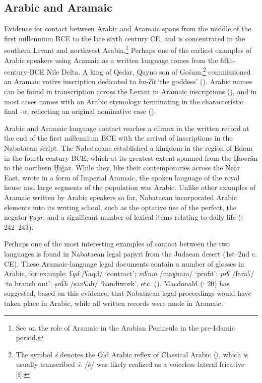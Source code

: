\documentclass[output=paper]{langsci/langscibook}
\begin{document}
\subsection{Arabic and Aramaic}
Evidence for contact between Arabic and Aramaic spans from the middle of the first millennium BCE to the late sixth century CE, and is concentrated in the southern Levant and northwest Arabia.\footnote{See \citet{Stein2018} on the role of Aramaic in the Arabian Peninsula in the pre-Islamic period.} Perhaps one of the earliest examples of Arabic speakers using Aramaic as a written language comes from the fifth-century-BCE Nile Delta. A king of Qedar, Qayno  son of Gośam,\footnote{The symbol \textit{ś} denotes the Old Arabic reflex of Classical Arabic 〈〉, which is usually transcribed \textit{š}. /ś/ was likely realized as a voiceless lateral fricative [ɬ].} commissioned an Aramaic votive inscription dedicated to \textit{hn-ʔlt} ‘the goddess’ (\citealt{Rabinowitz1956}). Arabic names can be found in transcription across the Levant in Aramaic inscriptions (\citealt{Israel1995}), and in most cases names with an Arabic etymology terminating in the characteristic final \textit{-w}, reflecting an original nominative case (\citealt{Al-Jalladforthcoming}). 

Arabic and Aramaic language contact reaches a climax in the written record at the end of the first millennium BCE with the arrival of inscriptions in the Nabataean script. The Nabataeans established a kingdom in the region of Edom in the fourth century BCE, which at its greatest extent spanned from the Ḥawrān to the northern Ḥiǧāz. While they, like their contemporaries across the Near East, wrote in a form of Imperial Aramaic, the spoken language of the royal house and large segments of the population was Arabic. Unlike other examples of Aramaic written by Arabic speakers so far, Nabataean incorporated Arabic elements into its writing school, such as the optative use of the perfect, the negator \textit{ɣayr}, and a significant number of lexical items relating to daily life (\citealt{Gzella2015}: 242--243).

Perhaps one of the most interesting examples of contact between the two languages is found in Nabataean legal papyri from the Judaean desert (1st--2nd c. CE). These Aramaic-language legal documents contain a number of glosses in Arabic, for example: \textit{ʕqd} /ʕaqd/ ‘contract’; \textit{mʕnm} /maɣnam/ ‘profit’; \textit{prʕ} /faraʕ/ ‘to branch out’; \textit{ṣnʕh} /ṣanʕah/ ‘handiwork’, etc. (\citealt{Yardeni2014}). Macdonald (\citeyear{Macdonald2010}: 20) has suggested, based on this evidence, that Nabataean legal proceedings would have taken place in Arabic, while all written records were made in Aramaic.
\end{document}
